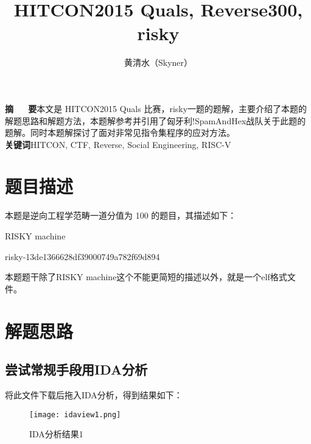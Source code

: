 \documentclass[a4paper,UTF8]{ctexart}
\title{HITCON2015 Quals, Reverse300, risky}
\author{黄清水（Skyner）}
\affil{哈尔滨工业大学，软件学院，skyner@foxmail.com}
\date{}
\begin{document}
\maketitle

\begin{center}
\parbox{0.9\textwidth}{
\textbf{摘~~~要}\quad 本文是 HITCON2015 Quals 比赛，risky一题的题解，主要介绍了本题的解题思路和解题方法，本题解参考并引用了匈牙利!SpamAndHex战队关于此题的题解\cite{writeup}。同时本题解探讨了面对非常见指令集程序的应对方法。\\
\textbf{关键词}\quad HITCON, CTF, Reverse, Social Engineering, RISC-V\\}
\end{center}



\section{题目描述}

本题是逆向工程学范畴一道分值为 100 的题目，其描述如下：\\

\begin{quizdesc}[label=Reverse300 risky]
RISKY machine

risky-13de1366628df39000749a782f69d894
\end{quizdesc}

本题题干除了RISKY machine这个不能更简短的描述以外，就是一个elf格式文件。

\section{解题思路}

\subsection{尝试常规手段用IDA分析}
将此文件下载后拖入IDA分析，得到结果如下：

\begin{figure}[hbt!]
  \centering
  \texttt{[image: idaview1.png]}
  \caption{IDA分析结果1}\label{idaview1}
\end{figure}
\end{document}
